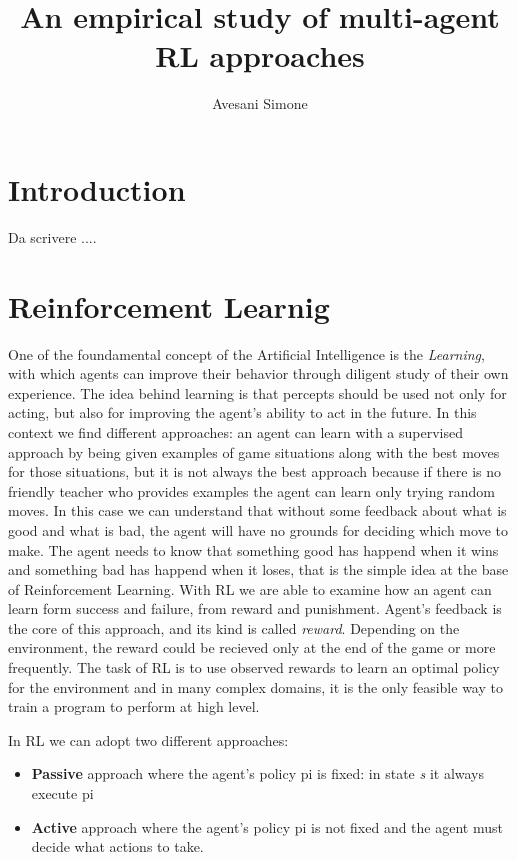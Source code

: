 \documentclass[]{report}
\title{An empirical study of multi-agent RL approaches}
\author{Avesani Simone}
\date{}
\begin{document}
\maketitle
\newpage
\tableofcontents
\newpage



\chapter{Introduction}
Da scrivere ....
\chapter{Reinforcement Learnig}\label{reinforcement-learnig}

One of the foundamental concept of the Artificial Intelligence is the
\emph{Learning}, with which agents can improve their behavior through
diligent study of their own experience. The idea behind learning is that
percepts should be used not only for acting, but also for improving the
agent's ability to act in the future. In this context we find different
approaches: an agent can learn with a supervised approach by being given
examples of game situations along with the best moves for those
situations, but it is not always the best approach because if there is
no friendly teacher who provides examples the agent can learn only
trying random moves. In this case we can understand that without some
feedback about what is good and what is bad, the agent will have no
grounds for deciding which move to make. The agent needs to know that
something good has happend when it wins and something bad has happend
when it loses, that is the simple idea at the base of Reinforcement
Learning. With RL we are able to examine how an agent can learn form
success and failure, from reward and punishment. Agent's feedback is the
core of this approach, and its kind is called \emph{reward}. Depending
on the environment, the reward could be recieved only at the end of the
game or more frequently. The task of RL is to use observed rewards to
learn an optimal policy for the environment and in many complex domains,
it is the only feasible way to train a program to perform at high level.

In RL we can adopt two different approaches:

\begin{itemize}

\item
  \textbf{Passive} approach where the agent's policy pi is fixed: in
  state \emph{s} it always execute pi
\item
  \textbf{Active} approach where the agent's policy pi is not fixed and
  the agent must decide what actions to take.
\end{itemize}
\end{document}
